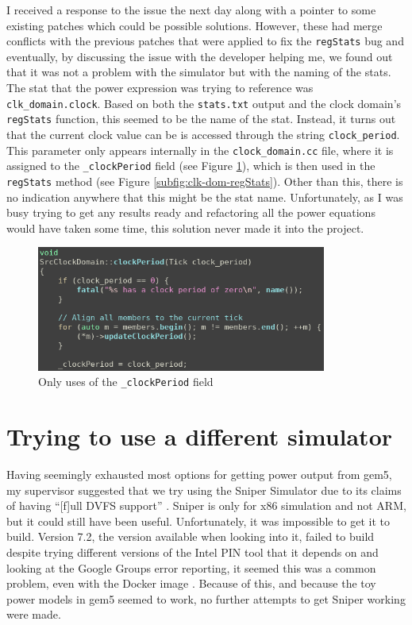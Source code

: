 I received a response to the issue the next day along with a pointer to 
some existing patches which could be possible solutions. However, these had 
merge conflicts with the previous patches that were applied to fix the 
\texttt{regStats} bug and eventually, by discussing the issue with the 
developer helping me, we found out that it was not a problem with the 
simulator but with the naming of the stats. The stat that the power 
expression was trying to reference was \texttt{clk\_domain.clock}. Based on 
both the \texttt{stats.txt} output and the clock domain's \texttt{regStats} 
function, this seemed to be the name of the stat. Instead, it turns out 
that the current clock value can be is accessed through the string 
\texttt{clock\_period}. This parameter only appears internally in the 
\texttt{clock\_domain.cc} file, where it is assigned to the 
\texttt{\_clockPeriod} field (see Figure \ref{fig:clock-period-src}), which 
is then used in the \texttt{regStats} method (see Figure 
\ref{subfig:clk-dom-regStats}). Other than this, there is no indication 
anywhere that this might be the stat name. Unfortunately, as I was busy 
trying to get any results ready and refactoring all the power equations 
would have taken some time, this solution never made it into the project.
\begin{figure}[H]
    \centering
    \includegraphics[width=0.85\textwidth]{screenshots/power-model-eldritchness/clock-period-src.png}
    \caption{Only uses of the \texttt{\_clockPeriod} field}
    \label{fig:clock-period-src}
\end{figure}

\section{Trying to use a different simulator}
Having seemingly exhausted most options for getting power output from gem5, my 
supervisor suggested that we try using the Sniper Simulator 
\cite{carlson_sniper_2011,carlson_evaluation_2014} due to its claims of having 
``[f]ull DVFS support'' \cite{noauthor_sniper_2020}. Sniper is only for x86 
simulation and not ARM, but it could still have been useful. Unfortunately, it 
was impossible to get it to build. Version 7.2, the version available when 
looking into it, failed to build despite trying different versions of the Intel 
PIN tool that it depends on \cite{noauthor_getting_2019} and looking at the 
Google Groups error reporting, it seemed this was a common problem, even with 
the Docker image \cite{noauthor_error_2020}. Because of this, and because the 
toy power models in gem5 seemed to work, no further attempts to get Sniper 
working were made.

